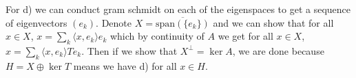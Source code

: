 \documentclass{article}
\begin{document}
\begin{enumerate}
    For d) we can conduct gram schmidt on each of the eigenspaces to get a sequence of eigenvectors \((e_k)\). Denote \(X = \overline{\text{span}(\{e_k\})}\) and we can show that for all \(x \in X\), \(x = \sum_k \langle x, e_k\rangle e_k\) which by continuity of \(A\) we get for all \(x \in X\), \(x = \sum_k \langle x, e_k\rangle Te_k\). Then if we show that \(X^\perp =\ker A\), we are done because \(H = X \oplus \ker T\) means we have d) for all \(x \in H\).

    
\end{enumerate}
\end{document}
